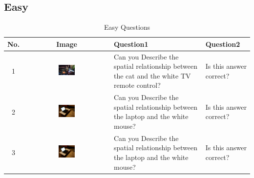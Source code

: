 \documentclass[journal,10pt]{IEEEtran}
\begin{document}
\onecolumn
\subsection{Easy}
\begin{longtable}{|c|c|p{5cm}|p{5cm}|}
    \caption{Easy Questions}
    \label{tab:easy}\\
    \hline
    \textbf{No.} & \textbf{Image} & \textbf{Question1} & \textbf{Question2} \\
    \hline
    \endfirsthead
    1 & \includegraphics[width=0.2\textwidth]{../image set/easy/000000000599.jpg} & Can you Describe the spatial relationship between the cat and the white TV remote control? & Is this answer correct? \\
    \hline
    2 & \includegraphics[width=0.2\textwidth]{../image set/easy/000000004057.jpg} & Can you Describe the spatial relationship between the laptop and the white mouse? & Is this answer correct? \\ \hline
    3 & \includegraphics[width=0.2\textwidth]{../image set/easy/000000004057.jpg} & Can you Describe the spatial relationship between the laptop and the white mouse? & Is this answer correct? \\
\end{longtable}
\end{document}
